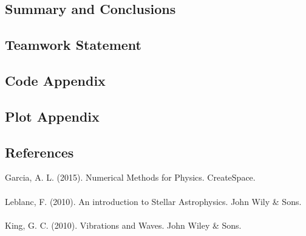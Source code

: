 \documentclass[letter,11pt]{article}
\begin{document}
\subsection*{Summary and Conclusions}

\begin{thebibliography}{99}
\end{thebibliography}

\subsection*{Teamwork Statement}

\subsection*{Code Appendix}

\subsection*{Plot Appendix}


\subsection*{References}

  Garcia, A. L. (2015). Numerical Methods for Physics. CreateSpace.\\\\

  Leblanc, F. (2010). An introduction to Stellar Astrophysics. John Wily & Sons. \\\\

  King, G. C. (2010). Vibrations and Waves. John Wiley & Sons.
\end{document}
